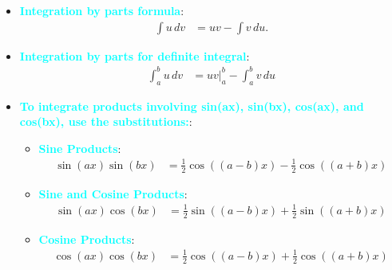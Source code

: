 \documentclass{report}
\begin{document}
    \begin{itemize}
        \item \textbf{\textcolor{cyan}{Integration by parts formula}}: 
            \begin{align*}
                \int u \, dv &= uv - \int v \, du 
            .\end{align*}
        \item \textbf{\textcolor{cyan}{Integration by parts for definite integral}}:
            \begin{align*}
                \int_{a}^{b} u \, dv &= uv\big|_{a}^{b} - \int_{a}^{b} v \, du
            \end{align*}
        \item \textbf{\textcolor{cyan}{To integrate products involving  sin(ax), sin(bx), cos(ax), and  cos(bx), use the substitutions:}}:
            \begin{itemize}
                \item \textbf{\textcolor{cyan}{Sine Products}}:
                    \begin{align*}
                        \sin(ax) \sin(bx) &= \frac{1}{2} \cos((a-b)x) - \frac{1}{2} \cos((a+b)x)
                    \end{align*}

                \item \textbf{\textcolor{cyan}{Sine and Cosine Products}}:
                    \begin{align*}
                        \sin(ax) \cos(bx) &= \frac{1}{2} \sin((a-b)x) + \frac{1}{2} \sin((a+b)x)
                    \end{align*}

                \item \textbf{\textcolor{cyan}{Cosine Products}}:
                    \begin{align*}
                        \cos(ax) \cos(bx) &= \frac{1}{2} \cos((a-b)x) + \frac{1}{2} \cos((a+b)x)
                    \end{align*}


\end{itemize}
\end{itemize}
\end{document}
